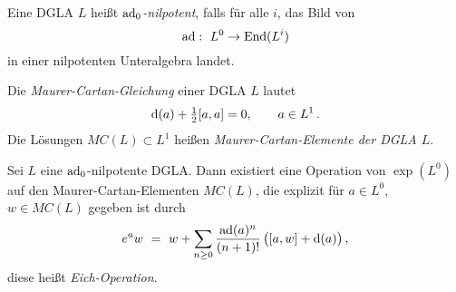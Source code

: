 \documentclass{vorlage}
\begin{document}
\begin{frame}[<+->]
  \begin{definition}[$\ad_0$-nilpotent]
    Eine DGLA $L$ heißt \emph{$\ad_0$-nilpotent}, falls für alle $i$, das Bild
    von 
    \[ \operatorname{ad}:\ L^0 \to \operatorname{End}(L^i)\]
    in einer nilpotenten Unteralgebra landet.
  \end{definition}
  \begin{definition}
    Die \emph{Maurer-Cartan-Gleichung} einer DGLA $L$ lautet
    \[ \operatorname{d}(a) + \tfrac 1 2 [a,a] = 0, \qquad a\in L^1\,.\]
    Die Lösungen $MC(L) \subset L^1$ heißen \emph{Maurer-Cartan-Elemente der 
    DGLA $L$}.
  \end{definition}
\end{frame}

\begin{frame}
  \begin{satz}
    Sei $L$ eine $\ad_0$-nilpotente DGLA. Dann existiert eine Operation
    von $\exp(L^0)$ auf den Maurer-Cartan-Elementen $MC(L)$, die explizit
    für $a\in L^0$, $w \in MC(L)$ gegeben ist durch
    \[ e^a w \ =\  w + \sum_{n\geq 0} \frac{\operatorname{ad}(a)^n}{(n+1)!}\,
      \big( [a,w] + \operatorname{d}(a) \big)\,,\]
    diese heißt \emph{Eich-Operation}.
  \end{satz}
\end{frame}
\end{document}
